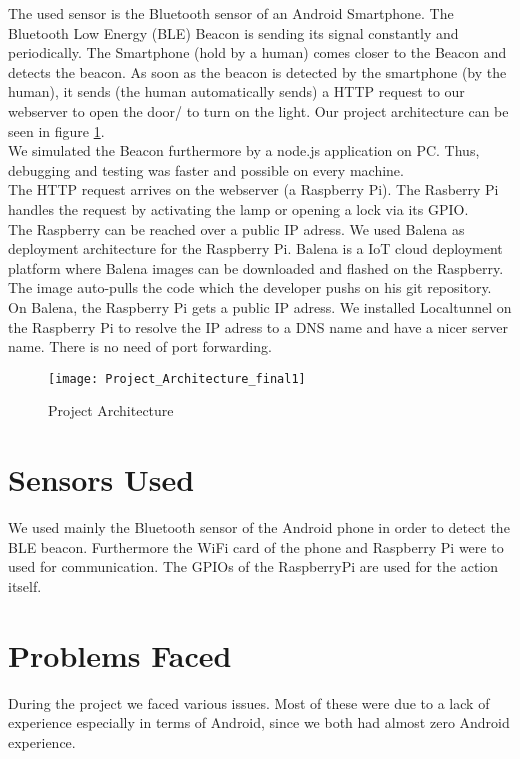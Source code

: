 \documentclass[
10pt, %
a4paper, %
oneside, %
headinclude,footinclude, %
BCOR5mm, %
]{scrartcl}
\begin{document}
\noindent The used sensor is the Bluetooth sensor of an Android Smartphone. The Bluetooth Low Energy (BLE) Beacon is sending its signal constantly and periodically. The Smartphone (hold by a human) comes closer to the Beacon and detects the beacon. As soon as the beacon is detected by the smartphone (by the human), it sends (the human automatically sends) a HTTP request to our webserver to open the door/ to turn on the light. Our project architecture can be seen in figure \ref{fig:projectarchitecturefinal}.\\

\noindent We simulated the Beacon furthermore by a node.js application on PC. Thus, debugging and testing was faster and possible on every machine.\\

\noindent The HTTP request arrives on the webserver (a Raspberry Pi). The Rasberry Pi handles the request by activating the lamp or opening a lock via its GPIO.\\

\noindent The Raspberry can be reached over a public IP adress. We used Balena as deployment architecture for the Raspberry Pi. Balena \cite{balena} is a IoT cloud deployment platform where Balena images can be downloaded and flashed on the Raspberry. The image auto-pulls the code which the developer pushs on his git repository. On Balena, the Raspberry Pi gets a public IP adress. We installed Localtunnel \cite{localtunnel} on the Raspberry Pi to resolve the IP adress to a DNS name and have a nicer server name. There is no need of port forwarding.
 
 
\begin{figure}[h]
	\centering
	\texttt{[image: Project\_Architecture\_final1]}
	\caption{Project Architecture}
	\label{fig:projectarchitecturefinal}
\end{figure}

\section{Sensors Used}
We used mainly the Bluetooth sensor of the Android phone in order to detect the BLE beacon. Furthermore the WiFi card of the phone and Raspberry Pi were to used for communication. The GPIOs of the RaspberryPi are used for the action itself.


\section{Problems Faced}
During the project we faced various issues. Most of these were due to a lack of experience especially in terms of Android, since we both had almost zero Android experience.
\end{document}
